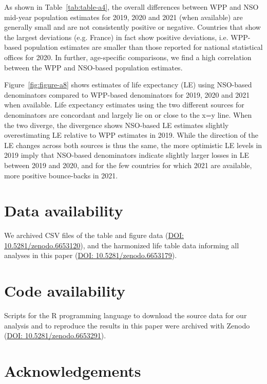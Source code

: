 \documentclass[12pt]{article}
\begin{document}
As shown in Table~\ref{tab:table-a4}, the overall differences between WPP and NSO mid-year population estimates for 2019, 2020 and 2021 (when available) are generally small and are not consistently positive or negative. Countries that show the largest deviations (e.g. France) in fact show positive deviations, i.e. WPP-based population estimates are smaller than those reported for national statistical offices for 2020. In further, age-specific comparisons, we find a high correlation between the WPP and NSO-based population estimates.

Figure~\ref{fig:figure-a8} shows estimates of life expectancy (LE) using NSO-based denominators compared to WPP-based denominators for 2019, 2020 and 2021 when available. Life expectancy estimates using the two different sources for denominators are concordant and largely lie on or close to the x=y line. When the two diverge, the divergence shows NSO-based LE estimates slightly overestimating LE relative to WPP estimates in 2019. While the direction of the LE changes across both sources is thus the same, the more optimistic LE levels in 2019 imply that NSO-based denominators indicate slightly larger losses in LE between 2019 and 2020, and for the few countries for which 2021 are available, more positive bounce-backs in 2021.

\clearpage

\section*{Data availability}

We archived CSV files of the table and figure data (\href{https://zenodo.org/record/6653120}{DOI: 10.5281/zenodo.6653120}), and the harmonized life table data informing all analyses in this paper (\href{https://zenodo.org/record/6653179}{DOI: 10.5281/zenodo.6653179}).

\section*{Code availability}

Scripts for the R programming language to download the source data for our analysis and to reproduce the results in this paper were archived with Zenodo (\href{https://zenodo.org/record/6653291}{DOI:  10.5281/zenodo.6653291}).

\clearpage


\clearpage
\appendix

\section*{Acknowledgements}
\end{document}
